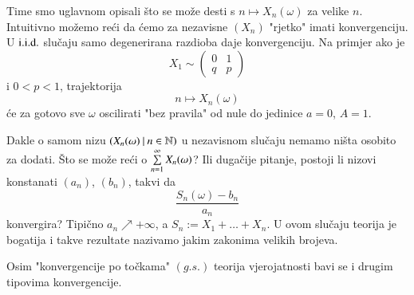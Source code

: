 \begin{nap} \label{nap:11.12}
    Time smo uglavnom opisali \v sto se mo\v ze desti s $n \mapsto X_n(\omega)$ za velike $n$.
    Intuitivno mo\v zemo re\' ci da \' cemo za nezavisne $(X_n)$ "rjetko" imati konvergenciju.
    U $\mathrm{i.i.d.}$ slu\v caju samo degenerirana razdioba daje konvergenciju.
    Na primjer ako je
    \begin{equation*}
        X_1 \sim
        \begin{pmatrix}
            0 & 1\\
            q & p
        \end{pmatrix}
    \end{equation*}
    i $0 < p < 1$, trajektorija
    \begin{equation*}
        n \mapsto X_n(\omega)
    \end{equation*}
    \' ce za gotovo sve $\omega$ oscilirati "bez pravila" od nule do jedinice $a = 0$, $A = 1$.

    Dakle o samom nizu $({X_n (\omega)} \: | \: {n \in \mathbb{N}})$ u nezavisnom slu\v caju nemamo ni\v sta osobito za dodati.
    \v Sto se mo\v ze re\' ci o $\sum\limits_{n = 1}^{\infty} X_n (\omega)$?
    Ili duga\v cije pitanje, postoji li nizovi konstanati $(a_n)$, $(b_n)$, takvi da
    \begin{equation*}
        \frac{S_n(\omega) - b_n}{a_n}
    \end{equation*}
    konvergira?
    Tipi\v cno $a_n \nearrow +\infty$, a $S_n := X_1 + \ldots + X_n$.
    U ovom slu\v caju teorija je bogatija i takve rezultate nazivamo jakim zakonima velikih brojeva.
\end{nap}

Osim "konvergencije po to\v ckama" $(g.s.)$ teorija vjerojatnosti bavi se i drugim tipovima konvergencije.

